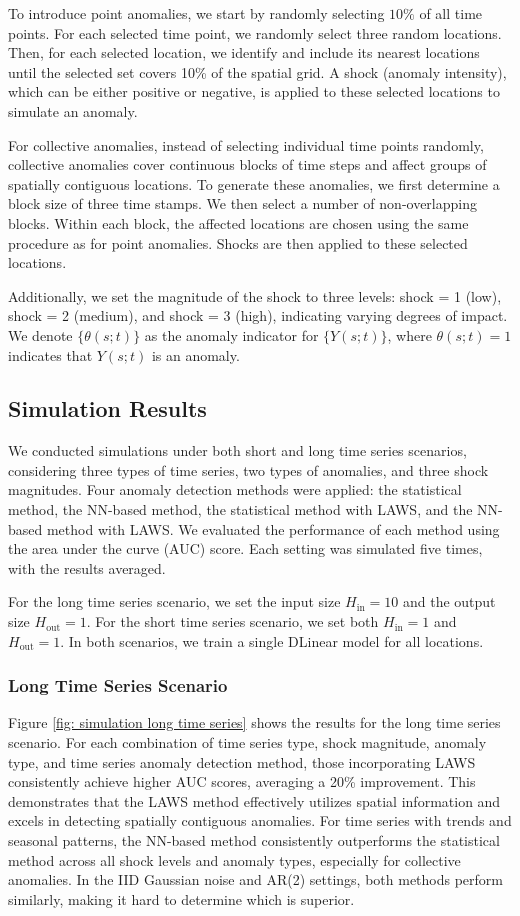 \documentclass[11pt]{article}
\begin{document}
To introduce point anomalies, we start by randomly selecting $10\%$ of all time points. For each selected time point, we randomly select three random locations. Then, for each selected location, we identify and include its nearest locations until the selected set covers 10\% of the spatial grid. A shock (anomaly intensity), which can be either positive or negative, is applied to these selected locations to simulate an anomaly.


For collective anomalies, instead of selecting individual time points randomly, collective anomalies cover continuous blocks of time steps and affect groups of spatially contiguous locations. To generate these anomalies, we first determine a block size of three time stamps. We then select a number of non-overlapping blocks. Within each block, the affected locations are chosen using the same procedure as for point anomalies. Shocks are then applied to these selected locations.

Additionally, we set the magnitude of the shock to three levels: shock = 1 (low), shock = 2 (medium), and shock = 3 (high), indicating varying degrees of impact. We denote $\{\theta(s;t)\}$ as the anomaly indicator for $\{Y(s;t)\}$, where $\theta(s;t) = 1$ indicates that $Y(s;t)$ is an anomaly.




\subsection{Simulation Results}
We conducted simulations under both short and long time series scenarios, considering three types of time series, two types of anomalies, and three shock magnitudes. Four anomaly detection methods were applied: the statistical method, the NN-based method, the statistical method with LAWS, and the NN-based method with LAWS. We evaluated the performance of each method using the area under the curve (AUC) score. Each setting was simulated five times, with the results averaged.


For the long time series scenario, we set the input size $H_{\mathrm{in}}=10$ and the output size $H_{\mathrm{out}}=1$. For the short time series scenario, we set both $H_{\mathrm{in}}=1$ and $H_{\mathrm{out}}=1$. In both scenarios, we train a single DLinear model for all locations.
\subsubsection*{Long Time Series Scenario}
Figure \ref{fig: simulation long time series} shows the results for the long time series scenario. For each combination of time series type, shock magnitude, anomaly type, and time series anomaly detection method, those incorporating LAWS consistently achieve higher AUC scores, averaging a 20\% improvement. This demonstrates that the LAWS method effectively utilizes spatial information and excels in detecting spatially contiguous anomalies. For time series with trends and seasonal patterns, the NN-based method consistently outperforms the statistical method across all shock levels and anomaly types, especially for collective anomalies. In the IID Gaussian noise and AR(2) settings, both methods perform similarly, making it hard to determine which is superior.
\end{document}

